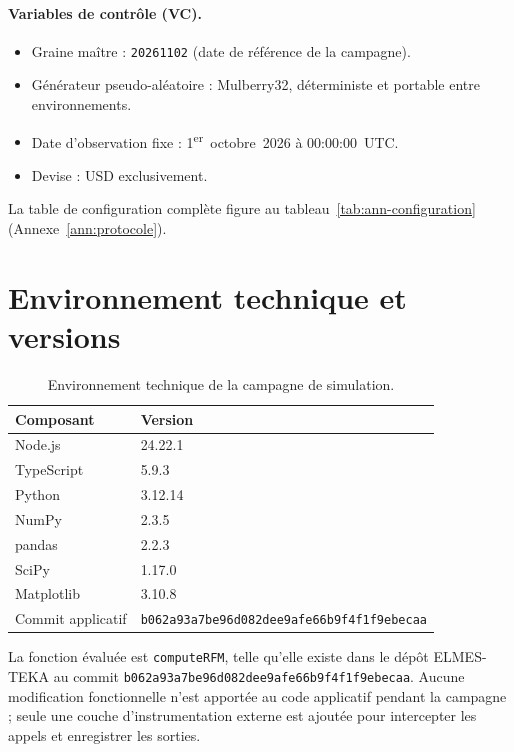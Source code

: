 \paragraph{Variables de contrôle (VC).}
\begin{itemize}
  \item Graine maître : \texttt{20261102} (date de référence de la campagne).
  \item Générateur pseudo-aléatoire : Mulberry32, déterministe et portable entre
    environnements.
  \item Date d'observation fixe : 1\textsuperscript{er}~octobre~2026 à 00:00:00~UTC.
  \item Devise : USD exclusivement.
\end{itemize}

La table de configuration complète figure au tableau~\ref{tab:ann-configuration}
(Annexe~\ref{ann:protocole}).

\section{Environnement technique et versions}
\label{sec:methodes-environnement}

\begin{table}[htb]
  \centering
  \caption{Environnement technique de la campagne de simulation.}
  \label{tab:methodes-environnement}
  \begin{tabular}{ll}
    \toprule
    Composant & Version \\
    \midrule
    Node.js        & 24.22.1 \\
    TypeScript     & 5.9.3 \\
    Python         & 3.12.14 \\
    NumPy          & 2.3.5 \\
    pandas         & 2.2.3 \\
    SciPy          & 1.17.0 \\
    Matplotlib     & 3.10.8 \\
    Commit applicatif & \texttt{\small b062a93a7be96d082dee9afe66b9f4f1f9ebecaa} \\
    \bottomrule
  \end{tabular}
\end{table}

La fonction évaluée est \texttt{computeRFM}, telle qu'elle existe dans le dépôt
ELMES-TEKA au commit \texttt{b062a93a7be96d082dee9afe66b9f4f1f9ebecaa}. Aucune
modification fonctionnelle n'est apportée au code applicatif pendant la campagne ;
seule une couche d'instrumentation externe est ajoutée pour intercepter les appels
et enregistrer les sorties.

